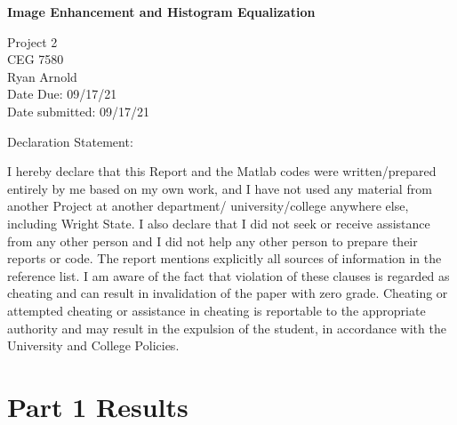 \documentclass[./rarnold_report2.tex]{subfiles}
\begin{document}


\begin{titlepage}
\begin{Large}
\begin{center} 
\textbf{Image Enhancement and Histogram Equalization} \\
\end{center}
\end{Large}
Project 2\\
CEG 7580\\
Ryan Arnold \\
Date Due: 09/17/21 \\
Date submitted: 09/17/21
\vspace{24pt}

\noindent Declaration Statement: 

\noindent I hereby declare that this Report and the Matlab codes were written/prepared entirely by me based on my own work, and I have not used any material from another Project at another department/ university/college anywhere else, including Wright State. I also declare that I did not seek or receive assistance from any other person and I did not help any other person to prepare their reports or code.  The report mentions explicitly all sources of information in the reference list. I am aware of the fact that violation of these clauses is regarded as cheating and can result in invalidation of the paper with zero grade. Cheating or attempted cheating or assistance in cheating is reportable to the appropriate authority and may result in the expulsion of the student, in accordance with the University and College Policies.

\end{titlepage}

\clearpage

\section*{Part 1 Results}
\end{document}
